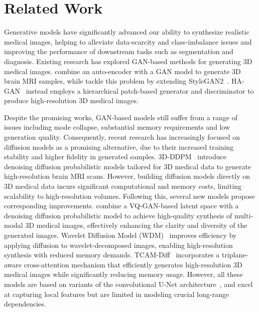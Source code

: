 \section{Related Work}

Generative models have significantly advanced our ability to synthesize realistic medical images, helping to alleviate data‑scarcity and class‑imbalance issues and improving the performance of downstream tasks such as segmentation and diagnosis. Existing research has explored GAN-based methods for generating 3D medical images. \citet{kwon2019generation} combine an auto-encoder with a GAN model to generate 3D brain MRI samples, while \citet{hong20213d} tackle this problem by extending StyleGAN2~\citep{karras2020analyzing}. %
HA-GAN~\citep{sun2022hierarchical} instead employs a hierarchical patch‑based generator and discriminator to produce high‑resolution 3D medical images. 

Despite the promising works, GAN-based models still suffer from a range of issues including mode collapse, substantial memory requirements and low generation quality. Consequently, recent research has increasingly focused on diffusion models as a promising alternative, due to their increased training stability and higher fidelity in generated samples. 3D-DDPM~\citep{dorjsembe2022three} introduce denoising diffusion probabilistic models tailored for 3D medical data to generate high-resolution brain MRI scans. However, building diffusion models directly on 3D medical data incurs significant computational and memory costs, limiting scalability to high-resolution volumes. Following this, several new models propose corresponding improvements. \citet{khader2023medical} combine a VQ-GAN-based latent space with a denoising diffusion probabilistic model to achieve high-quality synthesis of multi-modal 3D medical images, effectively enhancing the clarity and diversity of the generated images. Wavelet Diffusion Model (WDM)~\citep{friedrich2024wdm} improves efficiency by applying diffusion to wavelet-decomposed images, enabling high-resolution synthesis with reduced memory demands. TCAM-Diff~\citep{zhang2025tcam} incorporates a triplane-aware cross-attention mechanism that efficiently generates high-resolution 3D medical images while significantly reducing memory usage. However, all these models are based on variants of the convolutional U-Net architecture~\citep{ronneberger2015u}, and excel at capturing local features but are limited in modeling crucial long-range dependencies. 

